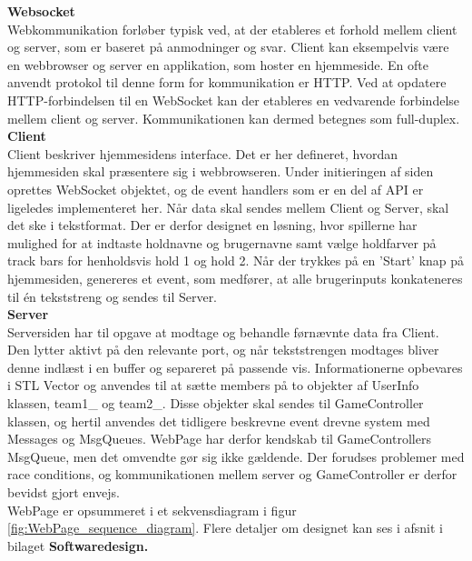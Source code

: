 \documentclass[Rapport/Rapport_main.tex]{subfiles}
\begin{document}
\textbf{Websocket}
\\Webkommunikation forløber typisk ved, at der etableres et forhold mellem client og server, som er baseret på anmodninger og svar. Client kan eksempelvis være en webbrowser og server en applikation, som hoster en hjemmeside. En ofte anvendt protokol til denne form for kommunikation er HTTP.\cite{http_wiki} Ved at opdatere HTTP-forbindelsen til en WebSocket kan der etableres en vedvarende forbindelse mellem client og server. Kommunikationen kan dermed betegnes som full-duplex.\cite{websocket_wiki}\\
\newline
\textbf{Client}\\
Client beskriver hjemmesidens interface. Det er her defineret, hvordan hjemmesiden skal præsentere sig i webbrowseren. Under initieringen af siden oprettes WebSocket objektet, og de event handlers som er en del af API er ligeledes implementeret her. Når data skal sendes mellem Client og Server, skal det ske i tekstformat. Der er derfor designet en løsning, hvor spillerne har mulighed for at indtaste holdnavne og brugernavne samt vælge holdfarver på track bars for henholdsvis hold 1 og hold 2. Når der trykkes på en 'Start' knap på hjemmesiden, genereres et event, som medfører, at alle brugerinputs konkateneres til én tekststreng og sendes til Server.\\
\newline
\textbf{Server}\\
Serversiden har til opgave at modtage og behandle førnævnte data fra Client. Den lytter aktivt på den relevante port, og når tekststrengen modtages bliver denne indlæst i en buffer og separeret på passende vis. Informationerne opbevares i STL Vector og anvendes til at sætte members på to objekter af UserInfo klassen, team1\_ og team2\_. Disse objekter skal sendes til GameController klassen, og hertil anvendes det tidligere beskrevne event drevne system med Messages og MsgQueues. WebPage har derfor kendskab til GameControllers MsgQueue, men det omvendte gør sig ikke gældende. Der forudses problemer med race conditions, og kommunikationen mellem server og GameController er derfor bevidst gjort envejs.\\WebPage er opsummeret i et sekvensdiagram i figur \ref{fig:WebPage_sequence_diagram}. Flere detaljer om designet kan ses i afsnit  i bilaget \textbf{Softwaredesign.}
\end{document}
